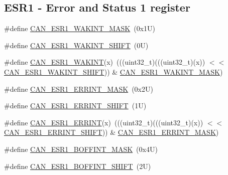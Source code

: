 \subsection*{E\+S\+R1 -\/ Error and Status 1 register}
\begin{DoxyCompactItemize}
\item 
\#define \mbox{\hyperlink{group___c_a_n___register___masks_gaebf477ebf4b3df88922476e9ac121e06}{C\+A\+N\+\_\+\+E\+S\+R1\+\_\+\+W\+A\+K\+I\+N\+T\+\_\+\+M\+A\+SK}}~(0x1\+U)
\item 
\#define \mbox{\hyperlink{group___c_a_n___register___masks_ga146781b97b78d98eb3925860a96cf217}{C\+A\+N\+\_\+\+E\+S\+R1\+\_\+\+W\+A\+K\+I\+N\+T\+\_\+\+S\+H\+I\+FT}}~(0\+U)
\item 
\#define \mbox{\hyperlink{group___c_a_n___register___masks_gad667657094be0f45301f3cca18ca5b52}{C\+A\+N\+\_\+\+E\+S\+R1\+\_\+\+W\+A\+K\+I\+NT}}(x)~(((uint32\+\_\+t)(((uint32\+\_\+t)(x)) $<$$<$ \mbox{\hyperlink{group___c_a_n___register___masks_ga146781b97b78d98eb3925860a96cf217}{C\+A\+N\+\_\+\+E\+S\+R1\+\_\+\+W\+A\+K\+I\+N\+T\+\_\+\+S\+H\+I\+FT}})) \& \mbox{\hyperlink{group___c_a_n___register___masks_gaebf477ebf4b3df88922476e9ac121e06}{C\+A\+N\+\_\+\+E\+S\+R1\+\_\+\+W\+A\+K\+I\+N\+T\+\_\+\+M\+A\+SK}})
\item 
\#define \mbox{\hyperlink{group___c_a_n___register___masks_ga18448e13304efd0d4fe37d26c60c3a05}{C\+A\+N\+\_\+\+E\+S\+R1\+\_\+\+E\+R\+R\+I\+N\+T\+\_\+\+M\+A\+SK}}~(0x2\+U)
\item 
\#define \mbox{\hyperlink{group___c_a_n___register___masks_gacee94f8f13909a6e02234076eecda564}{C\+A\+N\+\_\+\+E\+S\+R1\+\_\+\+E\+R\+R\+I\+N\+T\+\_\+\+S\+H\+I\+FT}}~(1\+U)
\item 
\#define \mbox{\hyperlink{group___c_a_n___register___masks_ga58609d99d3929630087de58539e00743}{C\+A\+N\+\_\+\+E\+S\+R1\+\_\+\+E\+R\+R\+I\+NT}}(x)~(((uint32\+\_\+t)(((uint32\+\_\+t)(x)) $<$$<$ \mbox{\hyperlink{group___c_a_n___register___masks_gacee94f8f13909a6e02234076eecda564}{C\+A\+N\+\_\+\+E\+S\+R1\+\_\+\+E\+R\+R\+I\+N\+T\+\_\+\+S\+H\+I\+FT}})) \& \mbox{\hyperlink{group___c_a_n___register___masks_ga18448e13304efd0d4fe37d26c60c3a05}{C\+A\+N\+\_\+\+E\+S\+R1\+\_\+\+E\+R\+R\+I\+N\+T\+\_\+\+M\+A\+SK}})
\item 
\#define \mbox{\hyperlink{group___c_a_n___register___masks_ga0f997f1d2ad00476745755aa74ce5084}{C\+A\+N\+\_\+\+E\+S\+R1\+\_\+\+B\+O\+F\+F\+I\+N\+T\+\_\+\+M\+A\+SK}}~(0x4\+U)
\item 
\#define \mbox{\hyperlink{group___c_a_n___register___masks_ga5e04e60e6627e38eaf02023308703a2e}{C\+A\+N\+\_\+\+E\+S\+R1\+\_\+\+B\+O\+F\+F\+I\+N\+T\+\_\+\+S\+H\+I\+FT}}~(2\+U)

\end{DoxyCompactItemize}
